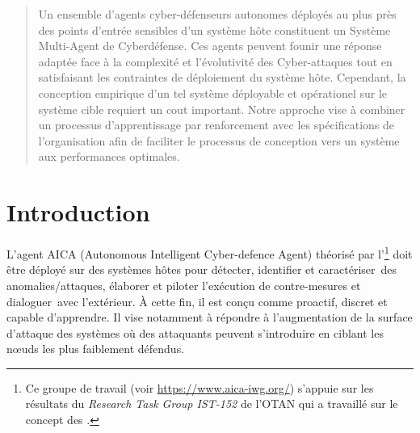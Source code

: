 \documentclass[conference]{IEEEtran}
\begin{document}
\maketitle

\begin{abstract}

Un ensemble d'agents cyber-défenseurs autonomes déployés au plus près des points d'entrée sensibles d'un système hôte constituent un Système Multi-Agent de Cyberdéfense. Ces agents peuvent founir une réponse adaptée face à la complexité et l'évolutivité des Cyber-attaques tout en satisfaisant les contraintes de déploiement du système hôte.
Cependant, la conception empirique d'un tel système déployable et opérationel sur le système cible requiert un cout important.
Notre approche vise à combiner un processus d'apprentissage par renforcement avec les spécifications de l'organisation afin de faciliter le processus de conception vers un système aux performances optimales.

\end{abstract}


\section{Introduction}


L'agent AICA (Autonomous Intelligent Cyber-defence Agent) théorisé par l'\footnote{Ce groupe de travail (voir \url{https://www.aica-iwg.org/}) s'appuie sur les résultats du \textit{Research Task Group IST-152} de l'OTAN qui a travaillé sur le concept des .} doit être déployé sur des systèmes hôtes pour détecter, identifier et caractériser des anomalies/attaques, élaborer et piloter l’exécution de contre-mesures et dialoguer avec l'extérieur. À cette fin, il est conçu comme proactif, discret et capable d’apprendre. Il vise notamment à répondre à l'augmentation de la surface d'attaque des systèmes  où des attaquants peuvent s'introduire en ciblant les nœuds les plus faiblement défendus\cite{kott2018autonomous}.
\end{document}
